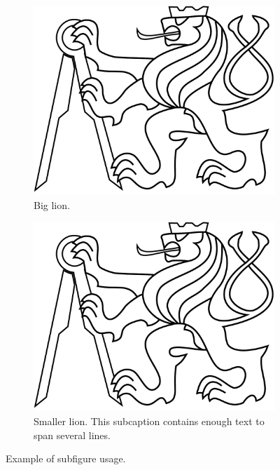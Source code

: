 \begin{figure}
  \begin{subfigure}[b]{0.5\LW}
    \centering
    \includegraphics[width=.6\LW]{lev} %
    \caption{Big lion.}
    \label{fig:lev2A}
  \end{subfigure}
  \begin{subfigure}[b]{0.5\LW}
    \centering
    \includegraphics[width=.5\LW]{lev}
    \caption{Smaller lion. This subcaption contains enough text to
      span several lines.}
    \label{fig:lev2B}
  \end{subfigure}
  \caption{Example of subfigure usage.}
  \label{fig:lev2}
\end{figure}

